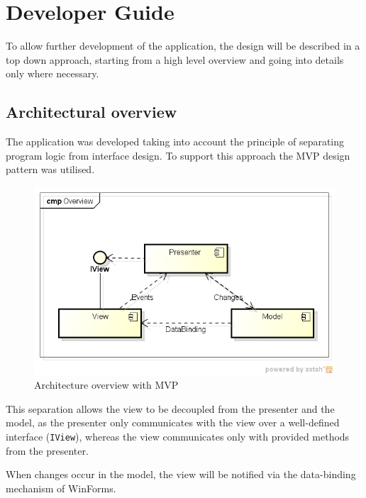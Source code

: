 \chapter{Developer Guide}\label{ch:developer_guide} %

To allow further development of the application, the design will be described in a top down approach, starting from a high level overview and going into details only where necessary.

\section{Architectural overview}
\label{sec:architectural overview}

The application was developed taking into account the principle of separating program logic from interface design. To support this approach the \acf{MVP} design pattern was utilised.

\begin{figure}[H]
\begin{center}
\includegraphics[width=\textwidth]{gfx/architecture_overview.png}
\caption{Architecture overview with \ac{MVP}}
\label{fig:architecture_overview}
\end{center}
\end{figure}

This separation allows the view to be decoupled from the presenter and the model, as the presenter only communicates with the view over a well-defined interface (\texttt{IView}), whereas the view communicates only with provided methods from the presenter.

When changes occur in the model, the view will be notified via the data-binding mechanism of WinForms.

